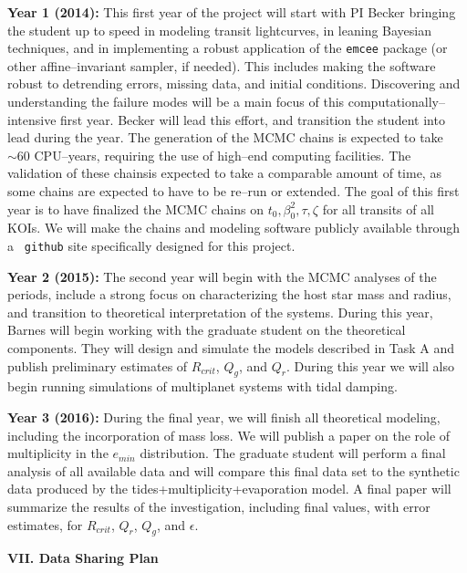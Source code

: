 {\bf Year 1 (2014):} This first year of the project will start with PI
Becker bringing the student up to speed in modeling transit
lightcurves, in leaning Bayesian techniques, and in implementing a
robust application of the {\tt emcee} package (or other
affine--invariant sampler, if needed).  This includes making the
software robust to detrending errors, missing data, and initial
conditions.  Discovering and understanding the failure modes will be a
main focus of this computationally--intensive first year.  Becker will
lead this effort, and transition the student into lead during the
year.  The generation of the MCMC chains is expected to take $\sim 60$
CPU--years, requiring the use of high--end computing facilities. The
validation of these chainsis expected to take a comparable amount of
time, as some chains are expected to have to be re--run or extended.
The goal of this first year is to have finalized the MCMC chains on
$t_0, \beta_0^2, \tau, \zeta$ for all transits of all KOIs.  We will
make the chains and modeling software publicly available through a {\tt
github} site specifically designed for this project.

{\bf Year 2 (2015):} The second year will begin with the MCMC analyses
of the periods, include a strong focus on characterizing the host star
mass and radius, and transition to theoretical interpretation of the
systems.  During this year, Barnes will begin working with the
graduate student on the theoretical components. They will design and
simulate the models described in Task A and publish preliminary
estimates of $R_{crit}$, $Q_g$, and $Q_r$. During this year we will
also begin running simulations of multiplanet systems with tidal
damping.

{\bf Year 3 (2016):} During the final year, we will finish all
theoretical modeling, including the incorporation of mass loss.  We
will publish a paper on the role of multiplicity in the $e_{min}$
distribution. The graduate student will perform a final analysis of
all available \kepler data and will compare this final data set to the
synthetic data produced by the tides+multiplicity+evaporation model.
A final paper will summarize the results of the investigation,
including final values, with error estimates, for $R_{crit}$, $Q_r$,
$Q_g$, and $\epsilon$.  


\bigskip
\centerline{\bf VII. Data Sharing Plan}
\smallskip

